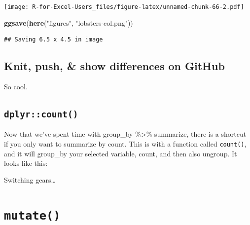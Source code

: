 \documentclass[]{book}
\newenvironment{Shaded}{\begin{snugshade}}{\end{snugshade}}
\newcommand{\CommentTok}[1]{\textcolor[rgb]{0.56,0.35,0.01}{\textit{#1}}}
\newcommand{\DataTypeTok}[1]{\textcolor[rgb]{0.13,0.29,0.53}{#1}}
\newcommand{\KeywordTok}[1]{\textcolor[rgb]{0.13,0.29,0.53}{\textbf{#1}}}
\newcommand{\NormalTok}[1]{#1}
\newcommand{\OperatorTok}[1]{\textcolor[rgb]{0.81,0.36,0.00}{\textbf{#1}}}
\newcommand{\StringTok}[1]{\textcolor[rgb]{0.31,0.60,0.02}{#1}}
\begin{document}
\texttt{[image: R-for-Excel-Users\_files/figure-latex/unnamed-chunk-66-2.pdf]}

\begin{Shaded}
\begin{Highlighting}[]
\KeywordTok{ggsave}\NormalTok{(}\KeywordTok{here}\NormalTok{(}\StringTok{"figures"}\NormalTok{, }\StringTok{"lobsters-col.png"}\NormalTok{))}
\end{Highlighting}
\end{Shaded}

\begin{verbatim}
## Saving 6.5 x 4.5 in image
\end{verbatim}

\hypertarget{knit-push-show-differences-on-github}{%
\subsection{Knit, push, \& show differences on GitHub}\label{knit-push-show-differences-on-github}}

So cool.

\hypertarget{dplyrcount}{%
\subsection{\texorpdfstring{\texttt{dplyr::count()}}{dplyr::count()}}\label{dplyrcount}}

Now that we've spent time with group\_by \%\textgreater{}\% summarize, there is a shortcut if you only want to summarize by count. This is with a function called \texttt{count()}, and it will group\_by your selected variable, count, and then also ungroup. It looks like this:

\begin{Shaded}
\end{Shaded}

Switching gears\ldots{}

\hypertarget{mutate}{%
\section{\texorpdfstring{\texttt{mutate()}}{mutate()}}\label{mutate}}
\end{document}
